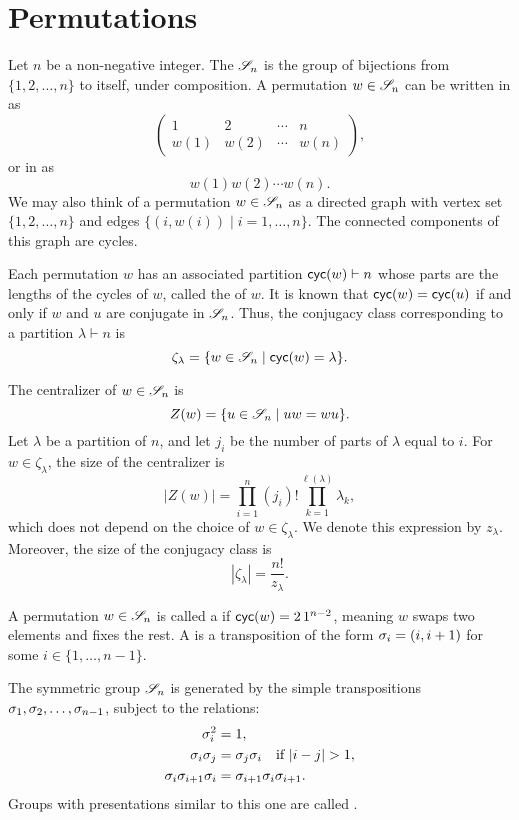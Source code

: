 \chapter{Permutations}

Let \(n\) be a non-negative integer.
The  \(\mathscr{S}_{n}\)
is the group of bijections from \(\{1, 2, \ldots, n\}\) to itself,
under composition.
A permutation \(w \in \mathscr{S}_{n}\) can be written in  as
\[
    \begin{pmatrix}
        1    & 2    & \cdots & n    \\
        w(1) & w(2) & \cdots & w(n)
    \end{pmatrix},
\]
or in  as
\[
    w(1)w(2)\cdots w(n).
\]
We may also think of a permutation \(w \in \mathscr{S}_{n}\) as a directed graph with vertex set \(\{1, 2, \ldots, n\}\) and edges \(\{(i, w(i)) \mid i = 1, \ldots, n\}\).
The connected components of this graph are cycles.

Each permutation \(w\) has an associated partition \(\operatorname{\mathsf{cyc}}(w) \vdash n\) whose parts are the lengths of the cycles of \(w\), called the  of \(w\). It is known that \(\operatorname{\mathsf{cyc}}(w) = \operatorname{\mathsf{cyc}}(u)\) if and only if \(w\) and \(u\) are conjugate in \(\mathscr{S}_{n}\). Thus, the conjugacy class corresponding to a partition \(\lambda \vdash n\) is
\[
    \zeta_\lambda = \{ w \in \mathscr{S}_{n} \mid \operatorname{\mathsf{cyc}}(w) = \lambda \}.
\]

The centralizer of \(w \in \mathscr{S}_{n}\) is
\[
    Z(w) = \{ u \in \mathscr{S}_{n} \mid uw = wu \}.
\]
Let \(\lambda\) be a partition of \(n\), and let \(j_i\) be the number of parts of \(\lambda\) equal to \(i\). For \(w \in \zeta_\lambda\), the size of the centralizer is
\[
    |Z(w)| = \prod_{i=1}^n (j_i)! \prod_{k=1}^{\ell(\lambda)} \lambda_k,
\]
which does not depend on the choice of \(w \in \zeta_\lambda\). We denote this expression by \(z_\lambda\). Moreover, the size of the conjugacy class is
\[
    |\zeta_\lambda| = \frac{n!}{z_\lambda}.
\]

A permutation \(w \in \mathscr{S}_{n}\) is called a  if \(\operatorname{\mathsf{cyc}}(w) = 2\,1^{n-2}\), meaning \(w\) swaps two elements and fixes the rest. A  is a transposition of the form \(\sigma_{i} = (i, i+1)\) for some \(i \in \{1, \ldots, n-1\}\).

The symmetric group \(\mathscr{S}_{n}\) is generated by the simple transpositions \(\sigma_{1}, \sigma_{2}, \ldots, \sigma_{n-1}\), subject to the relations:
\begin{align*}
    \sigma_{i}^2                 & = 1,                                           \\
    \sigma_{i}\sigma_{j}           & = \sigma_{j}\sigma_{i} \quad \text{if } |i-j| > 1, \\
    \sigma_{i}\sigma_{i+1}\sigma_{i} & = \sigma_{i+1}\sigma_{i}\sigma_{i+1}.
\end{align*}
Groups with presentations similar to this one are called .

